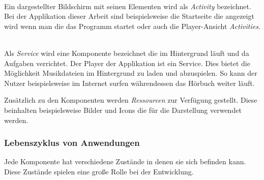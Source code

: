 \begin{description}[style=nextline]

	\item[Activities] \hfill \\
	Ein dargestellter Bildschirm mit seinen Elementen wird als \emph{Activity} bezeichnet. Bei der Applikation dieser Arbeit sind beispielsweise die Startseite die angezeigt wird wenn man die das Programm startet oder auch die Player-Ansicht \emph{Activities}.
	
	\item[Services] \hfill \\
	Als \emph{Service} wird eine Komponente bezeichnet die im Hintergrund läuft und da Aufgaben verrichtet. Der Player der Applikation ist ein Service. Dies bietet die Möglichkeit Musikdateien im Hintergrund zu laden und abzuspielen. So kann der Nutzer beispielsweise im Internet surfen währendessen das Hörbuch weiter läuft.
	
\end{description}

Zusätzlich zu den Komponenten werden \emph{Ressourcen} zur Verfügung gestellt. Diese beinhalten beispielsweise Bilder und Icons die für die Darstellung verwendet werden.

\subsubsection{Lebenszyklus von Anwendungen}

Jede Komponente hat verschiedene Zustände in denen sie sich befinden kann. Diese Zustände spielen eine große Rolle bei der Entwicklung. 

